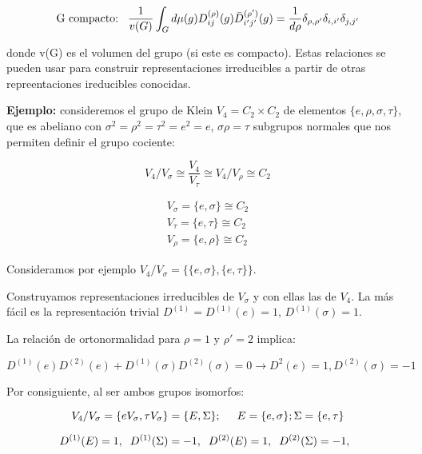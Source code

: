$$\text{G compacto:} \hspace{0.3cm} \frac{1}{v(G)}\int _G d\mu (g) D_{ij}^{(\rho )} (g) \bar{D}_{i'j'}^{ (\rho ')}(g)=\frac{1}{d\rho}\delta _{\rho , \rho '}\delta _{i, i'}\delta _{j,j'}$$

donde v(G) es el volumen del grupo (si este es compacto). Estas relaciones se pueden usar para construir representaciones irreducibles a partir de otras repreentaciones ireducibles conocidas.

\smallskip

\textbf{Ejemplo:} consideremos el grupo de Klein $V_4=C_2 \times C_2$ de elementos $\lbrace e, \rho , \sigma , \tau \rbrace $, que es abeliano con $\sigma ^2 = \rho ^2 = \tau ^2 =e^2 =e$, $\sigma \rho = \tau$ subgrupos normales que nos permiten definir el grupo cociente:

$$V_4/V_\sigma \cong \frac{V_4}{V_\tau}\cong V_4/V_\rho \cong C_2 $$

$$\begin{array}{c}
V_\sigma =\lbrace e, \sigma \rbrace \cong C_2  \\
V_\tau = \lbrace e, \tau \rbrace \cong C_2 \\
V_\rho = \lbrace e, \rho \rbrace  \cong C_2
\end{array}$$

\smallskip
Consideramos por ejemplo $V_4/V_\sigma =\lbrace \lbrace e, \sigma \rbrace , \lbrace e, \tau \rbrace \rbrace$.
\bigskip

Construyamos representaciones irreducibles de $V_\sigma $ y con ellas las de $V_4$. La más fácil es la representación trivial $D^{(1)}=D^{(1)}(e)=1$, $D^{(1)}(\sigma)=1$.

\smallskip
La relación de ortonormalidad para $\rho =1$ y $\rho '=2$ implica:

$$D^{(1)}(e)D^{(2)}(e)+D^{(1)}(\sigma)D^{(2)}(\sigma)=0 \to D^{2}(e)=1, D^{(2)}(\sigma)=-1$$

Por consiguiente, al ser ambos grupos isomorfos:

$$V_4/V_\sigma =\lbrace eV_\sigma, \tau V_\sigma \rbrace =\lbrace E, \Sigma \rbrace; \hspace{0.5cm} E=\lbrace e, \sigma \rbrace; \Sigma = \lbrace e, \tau \rbrace$$

$$D^{(1)}(E)=1, \hspace{0.2cm} D^{(1)}(\Sigma)=-1, \hspace{0.2cm} D^{(2)}(E)=1, \hspace{0.2cm} D^{(2)}(\Sigma)=-1, \hspace{0.2cm}$$

